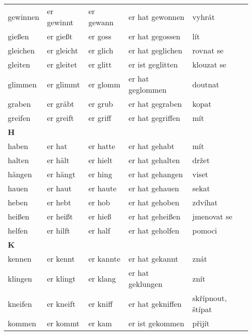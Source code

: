 \documentclass[a4paper,12pt]{report}
\begin{document}
\begin{longtable}{ | m{2cm} | m{2.5cm} | m{2.5cm} | m{4cm} | m{3cm} | }
    gewinnen    & er gewinnt    & er gewann    & er hat gewonnen    & vyhrát             \\
    gießen      & er gießt      & er goss      & er hat gegossen    & lít                \\
    gleichen    & er gleicht    & er glich     & er hat geglichen   & rovnat se          \\
    gleiten     & er gleitet    & er glitt     & er ist geglitten   & klouzat se         \\
    glimmen     & er glimmt     & er glomm     & er hat geglommen   & doutnat            \\
    graben      & er gräbt      & er grub      & er hat gegraben    & kopat              \\
    greifen     & er greift     & er griff     & er hat gegriffen   & mít                \\
    \hline
    \textbf{H}  &               &              &                    &                    \\
    haben       & er hat        & er hatte     & er hat gehabt      & mít                \\
    halten      & er hält       & er hielt     & er hat gehalten    & držet              \\
    hängen      & er hängt      & er hing      & er hat gehangen    & viset              \\
    hauen       & er haut       & er haute     & er hat gehauen     & sekat              \\
    heben       & er hebt       & er hob       & er hat gehoben     & zdvíhat            \\
    heißen      & er heißt      & er hieß      & er hat geheißen    & jmenovat se        \\
    helfen      & er hilft      & er half      & er hat geholfen    & pomoci             \\
    \hline
    \textbf{K}  &               &              &                    &                    \\
    kennen      & er kennt      & er kannte    & er hat gekannt     & znát               \\
    klingen     & er klingt     & er klang     & er hat geklungen   & znít               \\
    kneifen     & er kneift     & er kniff     & er hat gekniffen   & skřípnout, štípat  \\
    kommen      & er kommt      & er kam       & er ist gekommen    & přijít             \\

\end{longtable}
\end{document}
